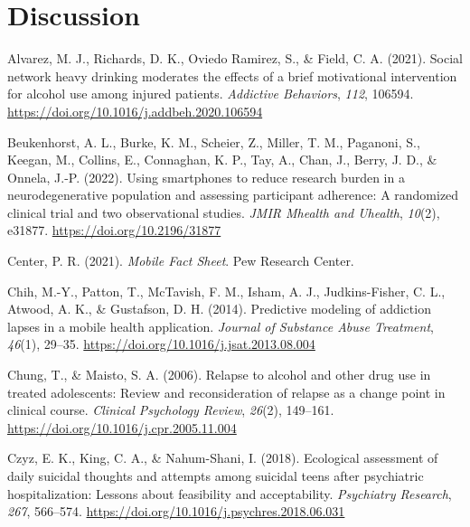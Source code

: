 \documentclass[
  letterpaper,
  DIV=11,
  numbers=noendperiod]{scrartcl}
\newlength{\cslhangindent}
\newenvironment{CSLReferences}[2] %
 {\begin{list}{}{%
  \setlength{\itemindent}{0pt}
  \setlength{\leftmargin}{0pt}
  \setlength{\parsep}{0pt}
  \ifodd #1
   \setlength{\leftmargin}{\cslhangindent}
   \setlength{\itemindent}{-1\cslhangindent}
  \fi
  \setlength{\itemsep}{#2\baselineskip}}}
 {\end{list}}
\begin{document}
\section{Discussion}\label{discussion}

\newpage

\label{refs}
\begin{CSLReferences}{1}{0}
Alvarez, M. J., Richards, D. K., Oviedo Ramirez, S., \& Field, C. A.
(2021). Social network heavy drinking moderates the effects of a brief
motivational intervention for alcohol use among injured patients.
\emph{Addictive Behaviors}, \emph{112}, 106594.
\url{https://doi.org/10.1016/j.addbeh.2020.106594}

Beukenhorst, A. L., Burke, K. M., Scheier, Z., Miller, T. M., Paganoni,
S., Keegan, M., Collins, E., Connaghan, K. P., Tay, A., Chan, J., Berry,
J. D., \& Onnela, J.-P. (2022). Using smartphones to reduce research
burden in a neurodegenerative population and assessing participant
adherence: {A} randomized clinical trial and two observational studies.
\emph{JMIR Mhealth and Uhealth}, \emph{10}(2), e31877.
\url{https://doi.org/10.2196/31877}

Center, P. R. (2021). \emph{Mobile {Fact Sheet}}. Pew Research Center.

Chih, M.-Y., Patton, T., McTavish, F. M., Isham, A. J., Judkins-Fisher,
C. L., Atwood, A. K., \& Gustafson, D. H. (2014). Predictive modeling of
addiction lapses in a mobile health application. \emph{Journal of
Substance Abuse Treatment}, \emph{46}(1), 29--35.
\url{https://doi.org/10.1016/j.jsat.2013.08.004}

Chung, T., \& Maisto, S. A. (2006). Relapse to alcohol and other drug
use in treated adolescents: {Review} and reconsideration of relapse as a
change point in clinical course. \emph{Clinical Psychology Review},
\emph{26}(2), 149--161. \url{https://doi.org/10.1016/j.cpr.2005.11.004}

Czyz, E. K., King, C. A., \& Nahum-Shani, I. (2018). Ecological
assessment of daily suicidal thoughts and attempts among suicidal teens
after psychiatric hospitalization: {Lessons} about feasibility and
acceptability. \emph{Psychiatry Research}, \emph{267}, 566--574.
\url{https://doi.org/10.1016/j.psychres.2018.06.031}


\end{CSLReferences}
\end{document}
